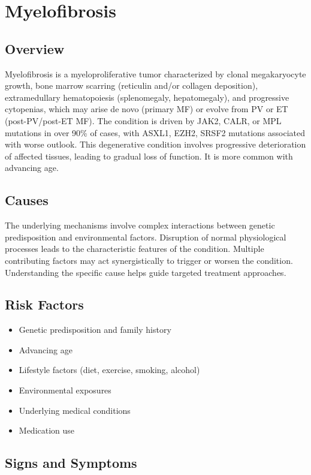 \chapter{Myelofibrosis}
\label{sec:Myelofibrosis}

\section{Overview}
Myelofibrosis is a myeloproliferative tumor characterized by clonal megakaryocyte growth, bone marrow scarring (reticulin and/or collagen deposition), extramedullary hematopoiesis (splenomegaly, hepatomegaly), and progressive cytopenias, which may arise de novo (primary MF) or evolve from PV or ET (post-PV/post-ET MF). The condition is driven by JAK2, CALR, or MPL mutations in over 90\% of cases, with ASXL1, EZH2, SRSF2 mutations associated with worse outlook. This degenerative condition involves progressive deterioration of affected tissues, leading to gradual loss of function. It is more common with advancing age.
\section{Causes}
The underlying mechanisms involve complex interactions between genetic predisposition and environmental factors. Disruption of normal physiological processes leads to the characteristic features of the condition. Multiple contributing factors may act synergistically to trigger or worsen the condition. Understanding the specific cause helps guide targeted treatment approaches.
\section{Risk Factors}


\begin{itemize}[noitemsep]
  \item Genetic predisposition and family history
  \item Advancing age
  \item Lifestyle factors (diet, exercise, smoking, alcohol)
  \item Environmental exposures
  \item Underlying medical conditions
  \item Medication use
\end{itemize}
\section{Signs and Symptoms}

